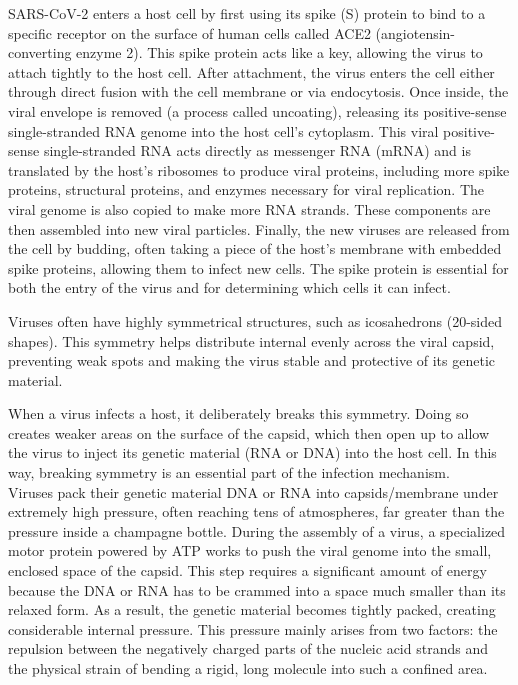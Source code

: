 \documentclass[12pt]{article}
\begin{document}
\begin{flushleft}
SARS-CoV-2 enters a host cell by first using its spike (S) protein to bind to a specific receptor on the surface of human cells called ACE2 (angiotensin-converting enzyme 2). This spike protein acts like a key, allowing the virus to attach tightly to the host cell. After attachment, the virus enters the cell either through direct fusion with the cell membrane or via endocytosis. Once inside, the viral envelope is removed (a process called uncoating), releasing its positive-sense single-stranded RNA genome into the host cell’s cytoplasm. This viral positive-sense single-stranded RNA acts directly as messenger RNA (mRNA) and is translated by the host's ribosomes to produce viral proteins, including more spike proteins, structural proteins, and enzymes necessary for viral replication. The viral genome is also copied to make more RNA strands. These components are then assembled into new viral particles. Finally, the new viruses are released from the cell by budding, often taking a piece of the host’s membrane with embedded spike proteins, allowing them to infect new cells. The spike protein is essential for both the entry of the virus and for determining which cells it can infect.

Viruses often have highly symmetrical structures, such as icosahedrons (20-sided shapes). This symmetry helps distribute internal evenly across the viral capsid, preventing weak spots and making the virus stable and protective of its genetic material.


When a virus infects a host, it deliberately breaks this symmetry. Doing so creates weaker areas on the surface of the capsid, which then open up to allow the virus to inject its genetic material (RNA or DNA) into the host cell. In this way, breaking symmetry is an essential part of the infection mechanism.\\




Viruses pack their genetic material DNA or RNA into capsids/membrane under extremely high pressure, often reaching tens of atmospheres, far greater than the pressure inside a champagne bottle. During the assembly of a virus, a specialized motor protein powered by ATP works to push the viral genome into the small, enclosed space of the capsid. This step requires a significant amount of energy because the DNA or RNA has to be crammed into a space much smaller than its relaxed form. As a result, the genetic material becomes tightly packed, creating considerable internal pressure. This pressure mainly arises from two factors: the repulsion between the negatively charged parts of the nucleic acid strands and the physical strain of bending a rigid, long molecule into such a confined area.\cite{BrandarizNunez2019}





\end{flushleft}
\end{document}
